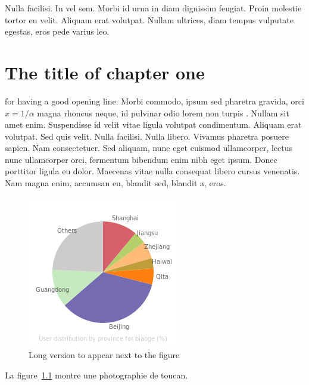 \begin{savequote}[75mm]
Nulla facilisi. In vel sem. Morbi id urna in diam dignissim feugiat. Proin molestie tortor eu velit. Aliquam erat volutpat. Nullam ultrices, diam tempus vulputate egestas, eros pede varius leo.
\end{savequote}

\chapter{The title of chapter one}

 for having a good opening line. Morbi commodo, ipsum sed pharetra gravida, orci  $x = 1/\alpha$ magna rhoncus neque, id pulvinar odio lorem non turpis \cite{Guichard2013}. Nullam sit amet enim. Suspendisse id velit vitae ligula volutpat  condimentum. Aliquam erat volutpat. Sed quis velit. Nulla facilisi. Nulla libero. Vivamus pharetra posuere sapien. Nam consectetuer. Sed aliquam, nunc eget euismod ullamcorper, lectus nunc ullamcorper orci, fermentum bibendum enim nibh eget ipsum. Donec porttitor ligula eu dolor. Maecenas vitae nulla consequat libero cursus venenatis. Nam magna enim, accumsan eu, blandit sed, blandit a, eros.

\zh{}


\begin{figure}[h]
    \centering
    \includegraphics{figures/memes/geo_pie_biaoge_Aug_20_2012_Sep_02_2012.png}
    \caption[Short version for LoF]{Long version to appear next to the figure}
    \label{fig:geopie_biaoge}
\end{figure}

La figure~\ref{fig:geopie_biaoge} montre une photographie de toucan.

